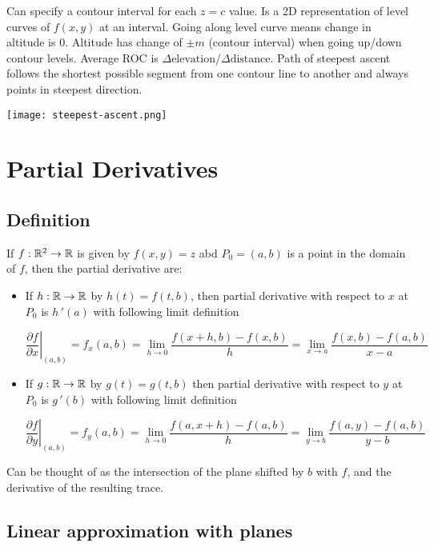 Can specify a contour interval for each $z=c$ value. Is a 2D representation of
level curves of $f(x,y)$ at an interval. Going along level curve means change in altitude is
0. Altitude has change of $\pm m$ (contour interval) when going up/down contour levels. Average ROC is $\Delta \text{elevation}/\Delta \text{distance}$.
Path of steepest ascent follows the shortest possible segment from one contour line to another and always points in steepest direction.

\begin{center}
    \texttt{[image: steepest-ascent.png]}
\end{center}

\section{Partial Derivatives}

\subsection{Definition}

If $f:\mathbb{R}^2\rightarrow \mathbb{R}$ is given by $f(x,y)=z$ abd $P_0=(a,b)$ is a point in the domain of $f$,
then the partial derivative are:
\begin{itemize}
    \item If $h:\mathbb{R}\rightarrow \mathbb{R}$ by $h(t)=f(t,b)$, then partial derivative with respect to $x$ at $P_0$
    is $h\,'(a)$ with following limit definition

    \[\left.\frac{\partial f}{\partial x}\right|_{(a, b)}=f_{x}(a, b)=\lim _{h \rightarrow 0} \frac{f(x+h, b)-f(x, b)}{h}=\lim _{x \rightarrow a} \frac{f(x, b)-f(a, b)}{x-a}\]

    \item If $g:\mathbb{R}\rightarrow \mathbb{R}$ by $g(t)=g(t,b)$ then partial derivative with respect to $y$ at $P_0$ is $g\,'(b)$ with following limit definition
    
    \[\left.\frac{\partial f}{\partial y}\right|_{(a, b)}=f_{y}(a, b)=\lim _{h \rightarrow 0} \frac{f(a, x+h)-f(a, b)}{h}=\lim _{y \rightarrow b} \frac{f(a, y)-f(a, b)}{y-b}\]

\end{itemize}

Can be thought of as the intersection of the plane shifted by $b$ with $f$, and the derivative of the resulting trace.

\subsection{Linear approximation with planes}

